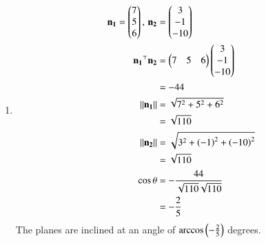 \documentclass[journal,12pt,twocolumn]{IEEEtran}
\begin{document}
\begin{enumerate}
\begin{enumerate}
\item
\begin{align}
\mathbf{n_1} = \begin{pmatrix}7\\5\\6\end{pmatrix}, \, \mathbf{n_2} &= \begin{pmatrix}3\\-1\\-10\end{pmatrix}\\
\mathbf{n_1}^{\top}\mathbf{n_2} &= \begin{pmatrix}7&5&6\end{pmatrix}\begin{pmatrix}3\\-1\\-10\end{pmatrix}\\
&= -44\\
\left\lVert\mathbf{n_1}\right\rVert &= \sqrt{7^2+5^2+6^2}\\ 
&= \sqrt{110}\\
\left\lVert\mathbf{n_2}\right\rVert &= \sqrt{3^2+\left(-1\right)^2+\left(-10\right)^2} \\
&= \sqrt{110}\\
\cos{\theta} &= -\frac{44}{\sqrt{110}\sqrt{110}}\\
&= -\frac{2}{5}
\end{align}
The planes are inclined at an angle of $\arccos\left({-\frac{2}{5}}\right)$ degrees.


\end{enumerate}
\end{enumerate}
\end{document}
